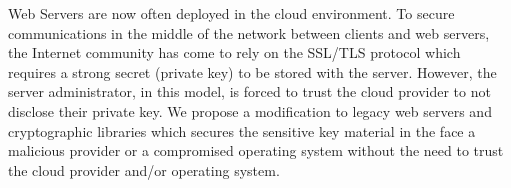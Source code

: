 \documentclass[../main.tex]{subfiles}
\begin{document}
  \noindent
  Web Servers are now often deployed in the cloud environment. To
  secure communications in the middle of the network between clients and web servers, 
  the Internet community has come to rely on the SSL/TLS protocol which requires a strong
  secret (private key) to be stored with the server. However, the server administrator, in this
  model, is forced to trust the cloud provider to not disclose their private key. We propose a
  modification to legacy web servers and cryptographic libraries which secures
  the sensitive key material in the face a malicious provider or a compromised operating system 
  without the need to trust the cloud provider and/or operating system.
\end{document}
